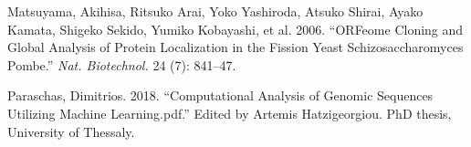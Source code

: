 \documentclass[
]{article}
\newlength{\cslhangindent}
\newlength{\cslentryspacingunit} %
\newenvironment{CSLReferences}[2] %
 {%
  \setlength{\parindent}{0pt}
  \ifodd #1
  \let\oldpar\par
  \def\par{\hangindent=\cslhangindent\oldpar}
  \fi
  \setlength{\parskip}{#2\cslentryspacingunit}
 }%
 {}
\begin{document}
\begin{CSLReferences}{1}{0}
\leavevmode{}%
Matsuyama, Akihisa, Ritsuko Arai, Yoko Yashiroda, Atsuko Shirai, Ayako Kamata, Shigeko Sekido, Yumiko Kobayashi, et al. 2006. {``{ORFeome} Cloning and Global Analysis of Protein Localization in the Fission Yeast Schizosaccharomyces Pombe.''} \emph{Nat. Biotechnol.} 24 (7): 841--47.

\leavevmode{}%
Paraschas, Dimitrios. 2018. {``Computational Analysis of Genomic Sequences Utilizing Machine Learning.pdf.''} Edited by Artemis Hatzigeorgiou. PhD thesis, University of Thessaly.

\end{CSLReferences}
\end{document}
